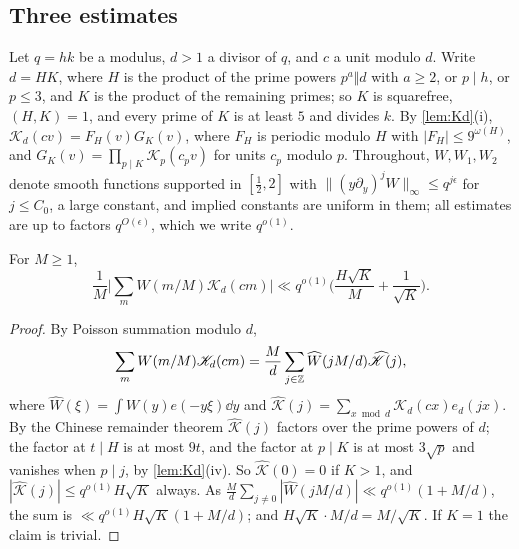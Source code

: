 \documentclass[11pt,colorlinks]{charlie}
\begin{document}
\subsection{Three estimates}
Let $q=hk$ be a modulus, $d>1$ a divisor of $q$, and $c$ a unit modulo $d$. Write $d=HK$, where $H$ is the product of the prime powers $p^a\Vert d$ with $a\ge2$, or $p\mid h$, or $p\le3$, and $K$ is the product of the remaining primes; so $K$ is squarefree, $(H,K)=1$, and every prime of $K$ is at least $5$ and divides $k$. By \cref{lem:Kd}(i), $\mathscr K_d(cv)=F_H(v)G_K(v)$, where $F_H$ is periodic modulo $H$ with $|F_H|\le9^{\omega(H)}$, and $G_K(v)=\prod_{p\mid K}\mathscr K_p(c_pv)$ for units $c_p$ modulo $p$. Throughout, $W,W_1,W_2$ denote smooth functions supported in $[\frac12,2]$ with $\|(y\partial_y)^jW\|_\infty\le q^{j\epsilon}$ for $j\le C_0$, a large constant, and implied constants are uniform in them; all estimates are up to factors $q^{O(\epsilon)}$, which we write $q^{o(1)}$.

\begin{lemma}\label{lem:onevar}
For $M\ge1$,
\[
 \frac1M\Big|\sum_mW(m/M)\mathscr K_d(cm)\Big|\ll q^{o(1)}\Big(\frac{H\sqrt K}M+\frac1{\sqrt K}\Big).
\]
\end{lemma}
\begin{proof}
By Poisson summation modulo $d$,
\[
 \sum_mW(m/M)\mathscr K_d(cm)=\frac Md\sum_{j\in\mathbb{Z}}\widehat W(jM/d)\widehat{\mathscr K}(j),
\]
where $\widehat W(\xi)=\int W(y)e(-y\xi)\dd y$ and $\widehat{\mathscr K}(j)=\sum_{x\bmod d}\mathscr K_d(cx)e_d(jx)$. By the Chinese remainder theorem $\widehat{\mathscr K}(j)$ factors over the prime powers of $d$; the factor at $t\mid H$ is at most $9t$, and the factor at $p\mid K$ is at most $3\sqrt p$ and vanishes when $p\mid j$, by \cref{lem:Kd}(iv). So $\widehat{\mathscr K}(0)=0$ if $K>1$, and $|\widehat{\mathscr K}(j)|\le q^{o(1)}H\sqrt K$ always. As $\frac Md\sum_{j\ne0}|\widehat W(jM/d)|\ll q^{o(1)}(1+M/d)$, the sum is $\ll q^{o(1)}H\sqrt K(1+M/d)$; and $H\sqrt K\cdot M/d=M/\sqrt K$. If $K=1$ the claim is trivial.
\end{proof}
\end{document}
